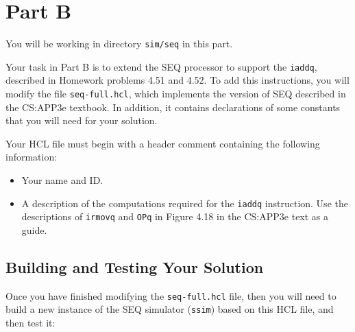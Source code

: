 \documentclass[11pt]{article}
\begin{document}
\section{Part B}

You will be working in directory \texttt{sim/seq} in this part.

Your task in Part B is to extend the SEQ processor to support the \texttt{iaddq}, 
described in Homework problems 4.51 and 4.52.
To add this instructions, you will modify the file
\texttt{seq-full.hcl},
which implements the version of SEQ described in the CS:APP3e textbook.
In addition, it contains declarations of some constants that you will
need for your solution.

Your HCL file must begin with a header comment containing
the following information:
\begin{itemize}
\item Your name and ID.
\item A description of the computations required for the \texttt{iaddq}
instruction. Use the descriptions of \texttt{irmovq} and {\tt OPq} 
in Figure 4.18 in the CS:APP3e text as a guide.
\end{itemize}

\subsection*{Building and Testing Your Solution}

Once you have finished modifying the \texttt{seq-full.hcl} file, then
you will need to build a new instance of the SEQ simulator (\texttt{ssim})
based on this HCL file, and then test it:
\end{document}

